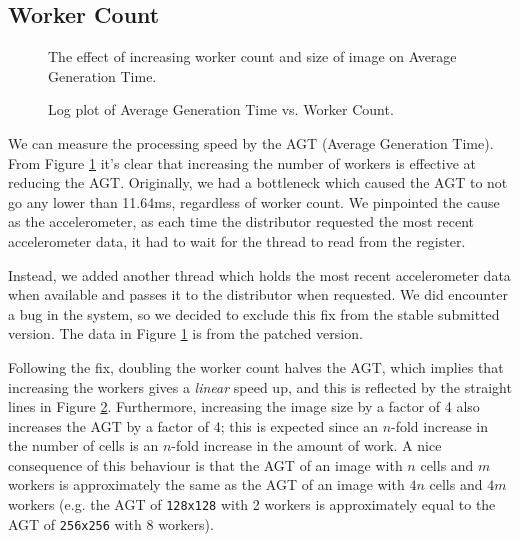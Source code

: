 \documentclass{article}
\begin{document}
    \subsection{Worker Count} 
    \label{workercount}

    \begin{figure}[h]
        \begin{center}
            
            \caption{The effect of increasing worker count and size of image on Average Generation Time.}
            \label{fig:agt}
        \end{center}
    \end{figure}
    
    \begin{figure}[h]
        \begin{center}
            
            \caption{Log plot of Average Generation Time vs. Worker Count.}
            \label{fig:agtplot}
        \end{center}
    \end{figure}

    We can measure the processing speed by the AGT (Average Generation Time). From Figure \ref{fig:agt} it's clear that increasing the number of workers is effective at reducing the AGT. Originally, we had a bottleneck which caused the AGT to not go any lower than 11.64ms, regardless of worker count. We pinpointed the cause as the accelerometer, as each time the distributor requested the most recent accelerometer data, it had to wait for the thread to read from the register. 
    
    Instead, we added another thread which holds the most recent accelerometer data when available and passes it to the distributor when requested. We did encounter a bug in the system, so we decided to exclude this fix from the stable submitted version. The data in Figure \ref{fig:agt} is from the patched version.

    Following the fix, doubling the worker count halves the AGT, which implies that increasing the workers gives a \textit{linear} speed up, and this is reflected by the straight lines in Figure \ref{fig:agtplot}. Furthermore, increasing the image size by a factor of 4 also increases the AGT by a factor of 4; this is expected since an $n$-fold increase in the number of cells is an $n$-fold increase in the amount of work. A nice consequence of this behaviour is that the AGT of an image with $n$ cells and $m$ workers is approximately the same as the AGT of an image with $4n$ cells and $4m$ workers (e.g. the AGT of \verb|128x128| with 2 workers is approximately equal to the AGT of \verb|256x256| with 8 workers).
\end{document}

